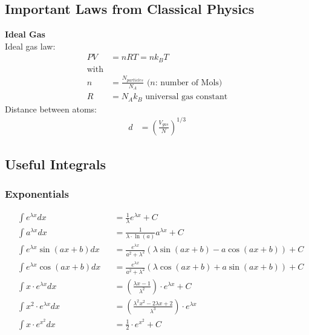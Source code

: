 \subsection{Important Laws from Classical Physics}
\textbf{Ideal Gas}\\
Ideal gas law:
\noindent\begin{align*}
    PV & =nRT=n k_B T                                             \\
    \text{with}                                                   \\
    n  & =\frac{N_{particles}}{N_A} \text{ ($n$: number of Mols)} \\
    R  & =N_A k_B \text{ universal gas constant}
\end{align*}
Distance between atoms:
\noindent\begin{align*}
    d & ={\left(\frac{V_{gas}}{N}\right)}^{1/3}
\end{align*}

\subsection{Useful Integrals}
\subsubsection{Exponentials}
\begin{footnotesize}
    \noindent\begin{align*}
         & \int e^{\lambda x}dx           &  & =\frac{1}{\lambda }e^{\lambda x}+C                                                 \\
         & \int a^{\lambda x}dx           &  & =\frac{1}{\lambda \cdot \ln(a)}a^{\lambda x}+C                                     \\
         & \int e^{\lambda x}\sin(ax+b)dx &  & =\frac{e^{\lambda x}}{a^2+\lambda ^2}\left(\lambda \sin(ax+b)-a\cos(ax+b)\right)+C \\
         & \int e^{\lambda x}\cos(ax+b)dx &  & =\frac{e^{\lambda x}}{a^2+\lambda ^2}\left(\lambda \cos(ax+b)+a\sin(ax+b)\right)+C \\
         & \int x \cdot e^{\lambda x}dx   &  & =(\frac{\lambda x-1}{\lambda ^2})\cdot e^{\lambda x}+C                             \\
         & \int x^2 \cdot e^{\lambda x}dx &  & =(\frac{\lambda ^2x^2-2\lambda x+2}{\lambda ^3})\cdot e^{\lambda x}                \\
         & \int x\cdot e^{x^2}dx          &  & =\frac{1}{2}\cdot e^{x^2}+C
    \end{align*}
\end{footnotesize}

